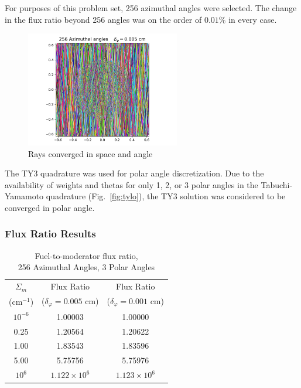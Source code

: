 \documentclass[12pt]{article}
\begin{document}
For purposes of this problem set, 256 azimuthal angles were selected. The change in the flux ratio beyond 256 angles was on the order of $0.01\%$ in every case.

\begin{figure}[H]
\centering
\includegraphics[width=0.6\textwidth]{figs/Converged.pdf}
\caption{Rays converged in space and angle}
\label{fig:converged}
\end{figure}

The TY3 quadrature was used for polar angle discretization. Due to the availability of weights and thetas for only 1, 2, or 3 polar angles in the Tabuchi-Yamamoto quadrature (Fig.~\ref{fig:tylo}), the TY3 solution was considered to be converged in polar angle.


\subsubsection{Flux Ratio Results}\label{sec:fluxratioresults}

\begin{table}[H]
\centering
\caption{Fuel-to-moderator flux ratio, \\ 256 Azimuthal Angles, 3 Polar Angles}
\label{tab:prob1}
\begin{tabular}{c|c|c}
\hline
$\Sigma_m$ & Flux Ratio   & Flux Ratio \\
(cm$^{-1}$) & ($\delta_\varphi = 0.005$ cm) & 
($\delta_\varphi = 0.001$ cm) \\
 \hline \hline
$10^{-6}$	&	1.00003	&	1.00000\\
0.25	 	&	1.20564	&	1.20622\\
1.00		&	1.83543	&	1.83596\\
5.00		&	5.75756	&	5.75976\\
$10^6$		&	$1.122\times10^6$	&	$1.123\times10^6$	\\
\end{tabular}
\end{table}
\end{document}
